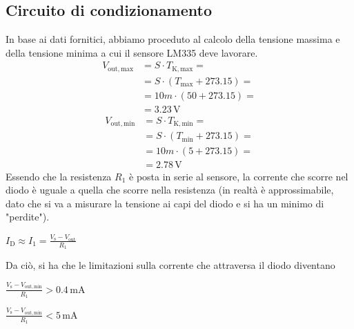 \documentclass[a4paper]{article}
\begin{document}
		\subsection{Circuito di condizionamento}
			In base ai dati fornitici, abbiamo proceduto al calcolo della tensione massima e della tensione minima a cui il sensore LM335 deve lavorare.
			\newline
			\begin{equation*}
				\begin{split}
					V_{\mathrm{out, max}} &= S \cdot T_{\mathrm{K, max}} = \\
										  &= S \cdot (T_{\mathrm{max}} + 273.15) = \\
										  &= 10m \cdot (50 + 273.15) = \\
										  &= 3.23 \, \mathrm{V}
				\end{split}
			\end{equation*}
			\begin{equation*}
				\begin{split}
					V_{\mathrm{out, min}} &= S \cdot T_{\mathrm{K, min}} = \\
										  &= S \cdot (T_{\mathrm{min}} + 273.15) = \\
										  &= 10m \cdot (5 + 273.15) = \\
										  &= 2.78 \, \mathrm{V}
				\end{split}
			\end{equation*}
			Essendo che la resistenza $ R_{1} $ è posta in serie al sensore, la corrente che scorre nel diodo è uguale a quella che scorre nella resistenza (in realtà è approssimabile, dato che si va a misurare la tensione ai capi del diodo e si ha un minimo di "perdite").
			\newline
			\begin{center}
				$ I_{\mathrm{D}} \approx I_{1} = \frac{V_{\mathrm{s}} - V_{\mathrm{out}}}{R_{1}} $
			\end{center}
			\newline
			Da ciò, si ha che le limitazioni sulla corrente che attraversa il diodo diventano
			\newline
			\begin{center}
				$ \frac{V_{\mathrm{s}} - V_{\mathrm{out, min}}}{R_{1}} > 0.4 \, \mathrm{mA} $
			\end{center}
			\newline
			\begin{center}
				$ \frac{V_{\mathrm{s}} - V_{\mathrm{out, min}}}{R_{1}} < 5 \, \mathrm{mA} $
			\end{center}
\end{document}
